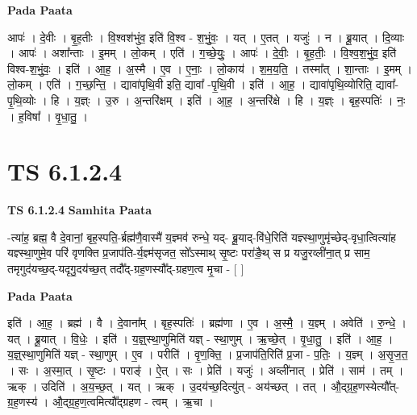 \documentclass[17pt]{extarticle}
\begin{document}
\textbf{Pada Paata} \newline

आपः॑ । दे॒वीः । बृ॒ह॒तीः । वि॒श्वश॑भुंव॒ इति॑ वि॒श्व - श॒भुं॒वः॒ । यत् । ए॒तत् । यजुः॑ । न । ब्रू॒यात् । दि॒व्याः । आपः॑ । अशा᳚न्ताः । इ॒मम् । लो॒कम् । एति॑ । ग॒च्छे॒युः॒ । आपः॑ । दे॒वीः॒ । बृ॒ह॒तीः॒ । वि॒श्व॒श॒भुं॒व॒ इति॑ विश्व-श॒भुं॒वः॒ । इति॑ । आ॒ह॒ । अ॒स्मै । ए॒व । ए॒नाः॒ । लो॒काय॑ । श॒म॒य॒ति॒ । तस्मा᳚त् । शा॒न्ताः । इ॒मम् । लो॒कम् । एति॑ । ग॒च्छ॒न्ति॒ । द्यावा॑पृथि॒वी इति॒ द्यावा᳚ -पृ॒थि॒वी । इति॑ । आ॒ह॒ । द्यावा॑पृथि॒व्योरिति॒ द्यावा᳚-पृ॒थि॒व्योः । हि । य॒ज्ञ्ः । उ॒रु । अ॒न्तरि॑क्षम् । इति॑ । आ॒ह॒ । अ॒न्तरि॑क्षे । हि । य॒ज्ञ्ः । बृह॒स्पतिः॑ । नः॒ । ह॒विषा᳚ । वृ॒धा॒तु॒ ।  \newline





\section{ TS 6.1.2.4 }

\textbf{TS 6.1.2.4 } \newline
\textbf{Samhita Paata} \newline

-त्या॑ह॒ ब्रह्म॒ वै दे॒वानां॒ बृह॒स्पति॒-र्ब्रह्म॑णै॒वास्मै॑ य॒ज्ञ्मव॑ रुन्धे॒ यद्- ब्रू॒याद्-वि॑धे॒रिति॑ यज्ञ्स्था॒णुमृ॑च्छेद्-वृधा॒त्वित्या॑ह यज्ञ्स्था॒णुमे॒व परि॑ वृणक्ति प्र॒जाप॑ति-र्य॒ज्ञ्म॑सृजत॒ सो᳚ऽस्माथ् सृ॒ष्टः परा॑ङै॒थ् स प्र यजु॒रव्ली॑ना॒त् प्र साम॒ तमृगुद॑यच्छ॒द्-यदृगु॒दय॑च्छ॒त् तदौ᳚द्-ग्रह॒णस्यौ᳚द्-ग्रहण॒त्व मृ॒चा - [  ] \newline

\textbf{Pada Paata} \newline

इति॑ । आ॒ह॒ । ब्रह्म॑ । वै । दे॒वाना᳚म् । बृह॒स्पतिः॑ । ब्रह्म॑णा । ए॒व । अ॒स्मै॒ । य॒ज्ञ्म् । अवेति॑ । रु॒न्धे॒ । यत् । ब्रू॒यात् । वि॒धेः॒ । इति॑ । य॒ज्ञ्॒स्था॒णुमिति॑ यज्ञ् - स्था॒णुम् । ऋ॒च्छे॒त् । वृ॒धा॒तु॒ । इति॑ । आ॒ह॒ । य॒ज्ञ्॒स्था॒णुमिति॑ यज्ञ् - स्था॒णुम् । ए॒व । परीति॑ । वृ॒ण॒क्ति॒ । प्र॒जाप॑ति॒रिति॑ प्र॒जा - प॒तिः॒ । य॒ज्ञ्म् । अ॒सृ॒ज॒त॒ । सः । अ॒स्मा॒त् । सृ॒ष्टः । पराङ्॑ । ऐ॒त् । सः । प्रेति॑ । यजुः॑ । अव्ली॑नात् । प्रेति॑ । साम॑ । तम् । ऋक् । उदिति॑ । अ॒य॒च्छ॒त् । यत् । ऋक् । उ॒दय॑च्छ॒दित्यु॑त् - अय॑च्छत् । तत् । औ॒द्ग्र॒ह॒णस्येत्यौ᳚त्-ग्र॒ह॒णस्य॑ । औ॒द्ग्र॒ह॒ण॒त्वमित्यौ᳚द्ग्रहण - त्वम् । ऋ॒चा ।  \newline
\end{document}
